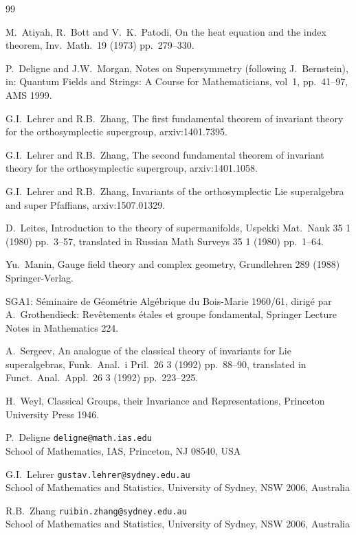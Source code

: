 \documentclass[11pt,a4paper]{article}
\theoremstyle{plain}
\theoremstyle{definition}
\begin{document}
\begin{thebibliography}{99}

M.~Atiyah, R.~Bott and V.~K.~Patodi, On the heat equation and the index theorem, Inv.\ Math.\ 19 (1973) pp.~279--330.

P.~Deligne and J.W.~Morgan, Notes on Supersymmetry (following J.~Bernstein), in: Quantum Fields and Strings: A Course for Mathematicians, vol~1, pp.~41--97, AMS 1999.

G.I.~Lehrer and R.B.~Zhang, The first fundamental theorem of invariant theory for the orthosymplectic supergroup, arxiv:1401.7395.

G.I.~Lehrer and R.B.~Zhang, The second fundamental theorem of invariant theory for the orthosymplectic supergroup, arxiv:1401.1058.

G.I.~Lehrer and R.B.~Zhang, Invariants of the orthosymplectic Lie superalgebra and super Pfaffians, arxiv:1507.01329.

D.~Leites, Introduction to the theory of supermanifolds, Uspekki Mat.\ Nauk 35 1 (1980) pp.~3--57, translated in Russian Math Surveys 35 1 (1980) pp.~1--64.

Yu.~Manin, Gauge field theory and complex geometry, Grundlehren 289 (1988) Springer-Verlag.

SGA1: S\'eminaire de G\'eom\'etrie Alg\'ebrique du Bois-Marie 1960/61, dirig\'e par A.~Grothendieck: Rev\^etements \'etales et groupe fondamental, Springer Lecture Notes in Mathematics 224.

A.~Sergeev, An analogue of the classical theory of invariants for Lie superalgebras, Funk.\ Anal.\ i Pril.\ 26 3 (1992) pp.~88--90, translated in Funct.\ Anal.\ Appl.\ 26 3 (1992) pp.~223--225.

H.~Weyl, Classical Groups, their Invariance and Representations, Princeton University Press 1946.

\end{thebibliography}

\vspace{1cm}
\noindent
P.~Deligne \quad \texttt{deligne@math.ias.edu}\\
School of Mathematics, IAS, Princeton, NJ 08540, USA

\vspace{0.5cm}
\noindent
G.I.~Lehrer \quad \texttt{gustav.lehrer@sydney.edu.au}\\
School of Mathematics and Statistics, University of Sydney, NSW 2006, Australia

\vspace{0.5cm}
\noindent
R.B.~Zhang \quad \texttt{ruibin.zhang@sydney.edu.au}\\
School of Mathematics and Statistics, University of Sydney, NSW 2006, Australia
\end{document}
